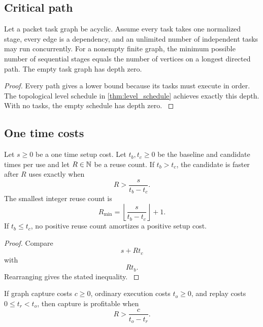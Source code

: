 \subsection{Critical path}\label{main:subsection:017}

\begin{theorem}\label{main:theorem:027}\label{thm:dag_depth}
Let a packet task graph be acyclic. Assume every task takes one normalized stage, every edge is a dependency, and an unlimited number of independent tasks may run concurrently. For a nonempty finite graph, the minimum possible number of sequential stages equals the number of vertices on a longest directed path. The empty task graph has depth zero.
\end{theorem}

\begin{proof}\label{main:proof:052}
Every path gives a lower bound because its tasks must execute in order. The topological level schedule in \cref{thm:level_schedule} achieves exactly this depth. With no tasks, the empty schedule has depth zero.
\label{main:proof:052:end}\end{proof}

\subsection{One time costs}\label{main:subsection:018}

\begin{theorem}\label{main:theorem:028}\label{thm:amortization}
Let \(s\geq0\) be a one time setup cost. Let $t_b,t_c\ge0$ be the baseline and candidate times per use and let $R\in\NN$ be a reuse count. If \(t_b>t_c\), the candidate is faster after \(R\) uses exactly when
\[
R>
\frac{s}{t_b-t_c}.
\]
The smallest integer reuse count is
\[
\boxed{
R_{\min}
=
\left\lfloor
\frac{s}{t_b-t_c}
\right\rfloor+1.
}
\]
If \(t_b\leq t_c\), no positive reuse count amortizes a positive setup cost.
\end{theorem}

\begin{proof}\label{main:proof:053}
Compare
\[
s+Rt_c
\]
with
\[
Rt_b.
\]
Rearranging gives the stated inequality.
\label{main:proof:053:end}\end{proof}

\begin{corollary}\label{main:corollary:016}\label{cor:graph_threshold}
If graph capture costs $c\ge0$, ordinary execution costs $t_o\ge0$, and replay costs $0\le t_r<t_o$, then capture is profitable when
\[
R>
\frac{c}{t_o-t_r}.
\]
\end{corollary}

